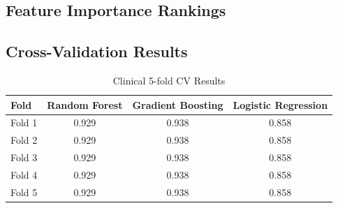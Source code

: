 \documentclass[12pt, a4paper]{article}
\begin{document}
\subsection{Feature Importance Rankings}

\begin{table}[htbp]
\centering
{}
\caption{Feature Importance Rankings}
\label{tab:feature_importance_rankings}
\end{table}

\subsection{Cross-Validation Results}

\begin{table}[htbp]
\centering
\begin{tabular}{@{}lccc@{}}
\toprule
\textbf{Fold} & \textbf{Random Forest} & \textbf{Gradient Boosting} & \textbf{Logistic Regression} \\ \midrule
Fold 1 & 0.929 & 0.938 & 0.858 \\
Fold 2 & 0.929 & 0.938 & 0.858 \\
Fold 3 & 0.929 & 0.938 & 0.858 \\
Fold 4 & 0.929 & 0.938 & 0.858 \\
Fold 5 & 0.929 & 0.938 & 0.858 \\ \bottomrule
\end{tabular}%
\caption{Clinical 5-fold CV Results}
\label{tab:clinical_cv_results}
\end{table}
\end{document}
